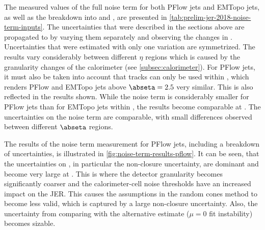 The measured values of the full noise term for both PFlow jets and EMTopo jets, as well as the breakdown into \Npileup and \Nmuzero, are presented in \cref{tab:prelim-jer-2018-noise-term-inputs}.
The uncertainties that were described in the sections above are propagated to \Nfull by varying them separately and observing the changes in \Nfull. Uncertainties that were estimated with only one variation are symmetrized.
The results vary considerably between different $\eta$ regions which is caused by the granularity changes of the calorimeter (see \cref{subsec:calorimeter}). For PFlow jets, it must also be taken into account that tracks can only be used within , which renders PFlow and EMTopo jets above $\abseta = 2.5$ very similar. This is also reflected in the results shown. While the noise term is considerably smaller for PFlow jets than for EMTopo jets within , the results become comparable at . The uncertainties on the noise term are comparable, with small differences observed between different $\abseta$ regions.

The results of the noise term measurement for PFlow jets, including a breakdown of uncertainties, is illustrated in \cref{fig:noise-term-results-pflow}.
%
It can be seen, that the uncertainties on \Npileup, in particular the non-closure uncertainty, are dominant and become very large at . This is where the detector granularity becomes significantly coarser and the calorimeter-cell noise thresholds have an increased impact on the JER. This causes the assumptions in the random cones method to become less valid, which is captured by a large non-closure uncertainty.
Also, the uncertainty from comparing \Nmuzero with the alternative estimate ($\mu=0$ fit instability) becomes sizable.




